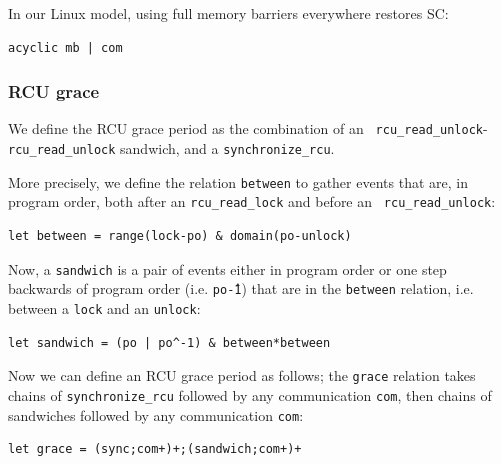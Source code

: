 \documentclass[a4paper]{article}
\begin{document}
In our Linux model, using full memory barriers everywhere restores SC:
\begin{verbatim}
acyclic mb | com
\end{verbatim}

\pagebreak

\subsubsection{RCU grace}

We define the RCU grace period as the combination of an {\tt
rcu\_read\_unlock}-{\tt rcu\_read\_unlock} sandwich,
and a {\tt synchronize\_rcu}. 

More precisely, we define the relation {\tt between} to gather events that are,
in program order, both after an {\tt rcu\_read\_lock} and before an {\tt
rcu\_read\_unlock}:
\begin{verbatim}
let between = range(lock-po) & domain(po-unlock)
\end{verbatim}

Now, a {\tt sandwich} is a pair of events either in program order or one step
backwards of program order (i.e. {\tt po\^-1}) that are in the {\tt between}
relation, i.e. between a {\tt lock} and an {\tt unlock}: 
\begin{verbatim}
let sandwich = (po | po^-1) & between*between
\end{verbatim}

Now we can define an RCU grace period as follows; the {\tt grace} relation
takes chains of {\tt synchronize\_rcu} followed by any communication {\tt com},
then chains of sandwiches followed by any communication {\tt com}:
\begin{verbatim}
let grace = (sync;com+)+;(sandwich;com+)+
\end{verbatim}
\end{document}
